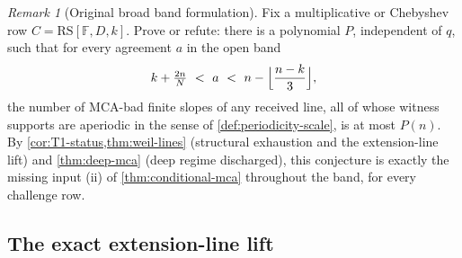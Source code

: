 \documentclass[11pt]{article}
\theoremstyle{definition}
\theoremstyle{remark}
\newtheorem{remark}[remark]{Remark}
\newcommand{\F}{\mathbb{F}}
\newcommand{\RS}{\mathrm{RS}}
\begin{document}
\begin{remark}[Original broad band formulation]\label{prob:band}
Fix a multiplicative or Chebyshev row $C=\RS[\F,D,k]$. Prove or refute: there is a polynomial $P$, independent of $q$, such that for every agreement $a$ in the open band
\[
k+\tfrac{2n}N\ <\ a\ <\ n-\Bigl\lfloor\frac{n-k}3\Bigr\rfloor ,
\]
the number of MCA-bad finite slopes of any received line, all of whose witness supports are aperiodic in the sense of \cref{def:periodicity-scale}, is at most $P(n)$. By \cref{cor:T1-status,thm:weil-lines} \textup(structural exhaustion and the extension-line lift\textup) and \cref{thm:deep-mca} \textup(deep regime discharged\textup), this conjecture is exactly the missing input \textup{(ii)} of \cref{thm:conditional-mca} throughout the band, for every challenge row.
\end{remark}

\subsection{The exact extension-line lift}\label{sec:discharge-T3}
\end{document}
